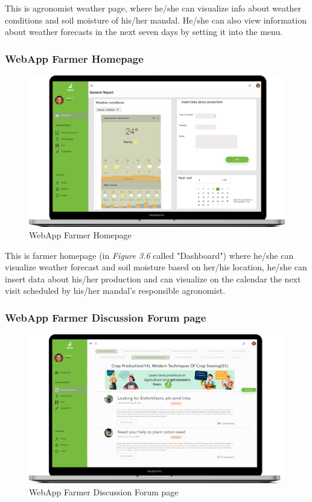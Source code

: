 This is agronomist weather page, where he/she can visualize info about weather conditions and soil moisture of his/her mandal. He/she can also view information about weather forecasts in the next seven days by setting it into the menu.

\subsubsection{WebApp Farmer Homepage}

\begin{figure}[H]
  \centering
  \centerline{\includegraphics[width=140mm,scale=0.9]{./Images//Mocks/WebApp/Farmer_Home.png}}
  \caption{WebApp Farmer Homepage}
\end{figure}

This is farmer homepage (in \textit{Figure 3.6} called "Dashboard") where he/she can visualize weather forecast and soil moisture based on her/his location, he/she can insert data about his/her production and can visualize on the calendar the next visit scheduled by his/her mandal's responsible agronomist.

\subsubsection{WebApp Farmer Discussion Forum page}

\begin{figure}[H]
  \centering
  \centerline{\includegraphics[width=140mm,scale=0.9]{./Images//Mocks/WebApp/Farmer_Forum.png}}
  \caption{WebApp Farmer Discussion Forum page}
\end{figure}

